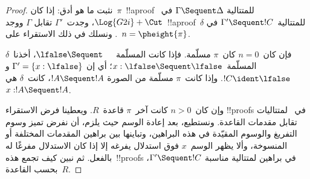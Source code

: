 \documentclass[../../../include/open-logic-section]{subfiles}
\begin{document}
\begin{proof}
  نثبت ما هو أدق: إذا كان~$\pi$~!!a{proof} للمتتالية
  $\Gamma \Sequent \Delta$ في~$\Log{G2i}+\Cut$، وجدت~$\Gamma'$ تقابل
  $\Gamma$ ووجد~!!a{proof}~$\delta$ للمتتالية~$\Gamma' \Sequent !C$ في
  . ونسلك في ذلك الاستقراء على~$n = \pheight{\pi}$.

  فإن كان~$n = 0$ كان~$\pi$ مسلّمة. فإذا كانت المسلّمة~$\lfalse \Sequent
  \quad$، أخذنا~$\delta$ المسلّمة~$x:\lfalse \Sequent \lfalse$؛ أي إن
  $\Gamma' = \{x:\lfalse\}$ و$!C \ident \lfalse$. وإذا كانت~$\pi$ مسلّمة
  من الصورة $!A \Sequent !A$، كانت~$\delta$ هي $x: !A \Sequent !A$.
  
  وإن كان~$n>0$ كانت آخر~$\pi$ قاعدة~$R$. ويعطينا فرض الاستقراء
  !!{proof}s في~ لمتتاليات تقابل مقدمات القاعدة. ونستطيع، بعد
  إعادة الوسم حيث يلزم، أن نفرض تميز وسوم التفريغ والوسوم المقيّدة في هذه
  البراهين، وتباينها بين براهين المقدمات المختلفة أو المنسوخة، وألا يظهر
  الوسم~$x$ فوق استدلال يفرغه إلا إذا كان الاستدلال مفرغًا له بالفعل.
  ثم نبين كيف تجمع هذه~!!{proof}s في براهين لمتتالية مناسبة
  $\Gamma' \Sequent !C$، بحسب القاعدة~$R$.


\end{proof}
\end{document}
